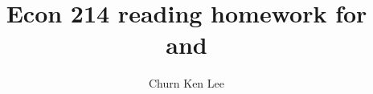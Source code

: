 \documentclass[12pt]{article}
\title{Econ 214 reading homework for \textcite{baxter_king_1993} and \textcite{woodford_2011}}
\author{Churn Ken Lee}
\date{}
\begin{document}
\maketitle

\section{\cite{baxter_king_1993}}

\section{\cite{woodford_2011}}

\printbibliography
\end{document}
